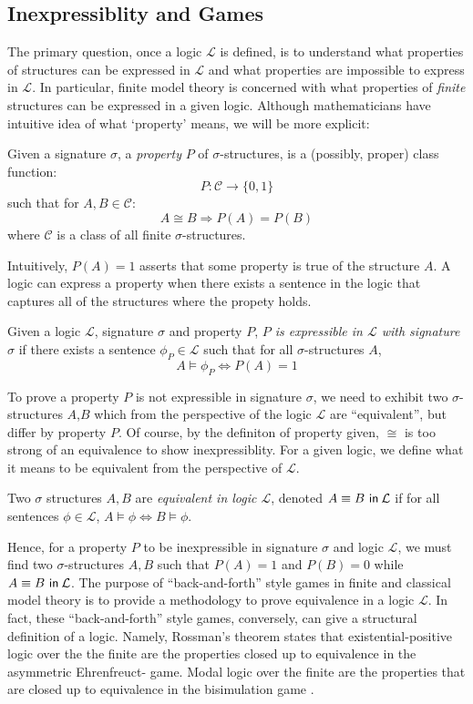 \subsection{Inexpressiblity and Games}
The primary question, once a logic $\mathcal{L}$ is defined, is to understand what properties of structures can be expressed in $\mathcal{L}$ and what properties are impossible to express in $\mathcal{L}$. In particular, finite model theory is concerned with what properties of \textit{finite} structures can be expressed in a given logic. Although mathematicians have intuitive idea of what `property' means, we will be more explicit:
\begin{defn}
Given a signature $\sigma$, a \textit{property} $P$ of $\sigma$-structures, is a (possibly, proper) class function:
$$P:\mathcal{C} \longrightarrow \{0,1\}$$
such that for $A,B \in \mathcal{C}$:
$$A \cong B \Rightarrow P(A) = P(B)$$ 
where $\mathcal{C}$ is a class of all finite $\sigma$-structures.
\end{defn}
Intuitively, $P(A) = 1$ asserts that some property is true of the structure $A$. A logic can express a property when there exists a sentence in the logic that captures all of the structures where the propety holds. 
\begin{defn}
Given a logic $\mathcal{L}$, signature $\sigma$ and property $P$, \textit{$P$ is expressible in $\mathcal{L}$ with signature $\sigma$} if there exists a sentence $\phi_{P} \in \mathcal{L}$ such that for all $\sigma$-structures $A$,
$$A \vDash \phi_{P} \Leftrightarrow P(A) = 1$$
\end{defn}
To prove a property $P$ is not expressible in signature $\sigma$, we need to exhibit two $\sigma$-structures $A$,$B$ which from the perspective of the logic $\mathcal{L}$ are ``equivalent'', but differ by property $P$. Of course, by the definiton of property given, $\cong$ is too strong of an equivalence to show inexpressiblity. For a given logic, we define what it means to be equivalent from the perspective of $\mathcal{L}$.  
\begin{defn}
Two $\sigma$ structures $A,B$ are \textit{equivalent in logic $\mathcal{L}$}, denoted ${A \equiv B \ \mathsf{in}\: \mathcal{L}}$ if for all sentences $\phi \in \mathcal{L}$, $A \vDash \phi \Leftrightarrow B \vDash \phi$.  
\label{defn:equivLogic}
\end{defn}
Hence, for a property $P$ to be inexpressible in signature $\sigma$ and logic $\mathcal{L}$, we must find two $\sigma$-structures $A,B$ such that $P(A) = 1$ and $P(B) = 0$ while ${A \equiv B \ \mathsf{in}\: \mathcal{L}}$. The purpose of ``back-and-forth'' style games in finite and classical model theory is to provide a methodology to prove equivalence in a logic $\mathcal{L}$. In fact, these ``back-and-forth'' style games, conversely, can give a structural definition of a logic. Namely, Rossman's theorem \cite{Rossman2008} states that existential-positive logic over the the finite are the properties closed up to equivalence in the asymmetric Ehrenfreuct-{\Fraisse} game. Modal logic over the finite are the properties that are closed up to equivalence in the bisimulation game \cite{Gradel2014}.   
